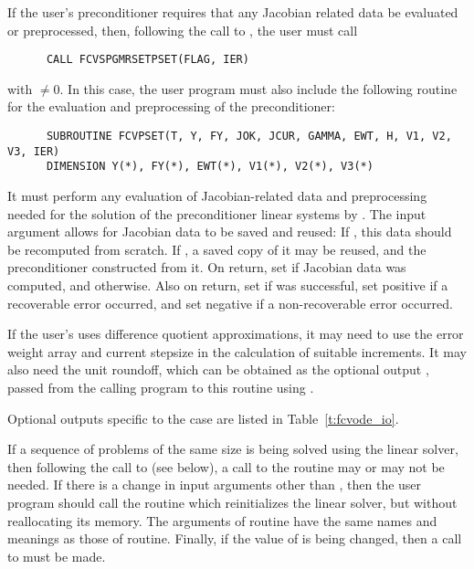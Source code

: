 \begin{Steps}
  If the user's preconditioner requires that any Jacobian related data be evaluated
  or preprocessed, then, following the call to , the user must
  call 
\begin{verbatim}
      CALL FCVSPGMRSETPSET(FLAG, IER)
\end{verbatim}
  with  $\neq 0$.
  In this case, the user program must also include
  the following routine for the evaluation and preprocessing of the preconditioner:
\begin{verbatim}
      SUBROUTINE FCVPSET(T, Y, FY, JOK, JCUR, GAMMA, EWT, H, V1, V2, V3, IER)
      DIMENSION Y(*), FY(*), EWT(*), V1(*), V2(*), V3(*) 
\end{verbatim}
  It must perform any evaluation of Jacobian-related data and preprocessing needed
  for the solution of the preconditioner linear systems by .
  The input argument  allows for Jacobian data to be saved and reused:
  If , this data should be recomputed from scratch. If ,
  a saved copy of it may be reused, and the preconditioner constructed from it.
  On return, set  if Jacobian data was computed, and  otherwise.
  Also on return, set  if  was successful, set 
  positive if a recoverable error occurred, and set  negative if a 
  non-recoverable error occurred.
  
  If the user's  uses difference quotient approximations, it
  may need to use the error weight array  and current stepsize 
  in the calculation of suitable increments.  It may also need the unit
  roundoff, which can be obtained as the optional output ,
  passed from the calling program to this routine using .

  Optional outputs specific to the {\spgmr} case are listed in Table~\ref{t:fcvode_io}.
  
  If a sequence of problems of the same size is being solved using the {\spgmr}
  linear solver, then following the call to  (see below), a call
  to the  routine may or may not be needed.  
  If there is a change in input arguments other than , then the user 
  program should call the routine  which
  reinitializes the {\spgmr} linear solver, but without reallocating its memory.
  The arguments of  routine have the same names and meanings
  as those of  routine.  Finally, if the value of  is
  being changed, then a call to  must be made.


\end{Steps}
